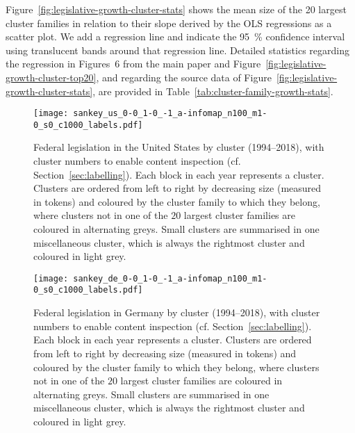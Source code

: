 Figure~\ref{fig:legislative-growth-cluster-stats} shows the mean size of the 20 largest cluster families in relation to their slope derived by the OLS regressions as a scatter plot.
We add a regression line and indicate the 95~\% confidence interval using translucent bands around that regression line.
Detailed statistics regarding the regression in Figures~6 from the main paper %
and Figure~\ref{fig:legislative-growth-cluster-top20}, 
and regarding the source data of Figure~\ref{fig:legislative-growth-cluster-stats}, 
are provided in Table~\ref{tab:cluster-family-growth-stats}.

\newpage

\begin{figure}[H]
	\centering
	\vspace*{-16pt}\texttt{[image: sankey\_us\_0-0\_1-0\_-1\_a-infomap\_n100\_m1-0\_s0\_c1000\_labels.pdf]}
	\caption{%
		Federal legislation in the United States by cluster (1994--2018), 
		with cluster numbers to enable content inspection (cf. Section~\ref{sec:labelling}). 
		Each block in each year represents a cluster. 
		Clusters are ordered from left to right by decreasing size (measured in tokens) and coloured by the cluster family to which they belong, 
		where clusters not in one of the $20$ largest cluster families are coloured in alternating greys. 
		Small clusters are summarised in one miscellaneous cluster, which is always the rightmost cluster and coloured in light grey.
	}
	\label{fig:sankey-us-labels}
\end{figure}

\newpage

\begin{figure}[H]
	\centering
	\vspace*{-16pt}\texttt{[image: sankey\_de\_0-0\_1-0\_-1\_a-infomap\_n100\_m1-0\_s0\_c1000\_labels.pdf]}
		\caption{%
		Federal legislation in Germany by cluster (1994--2018), 
		with cluster numbers to enable content inspection (cf. Section~\ref{sec:labelling}). 
		Each block in each year represents a cluster. 
		Clusters are ordered from left to right by decreasing size (measured in tokens) and coloured by the cluster family to which they belong, 
		where clusters not in one of the $20$ largest cluster families are coloured in alternating greys. 
		Small clusters are summarised in one miscellaneous cluster, which is always the rightmost cluster and coloured in light grey.
	}
	\label{fig:sankey-de-labels}
\end{figure}


